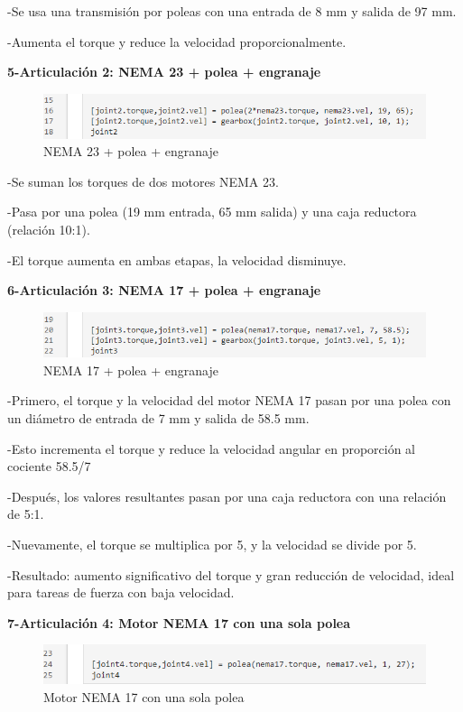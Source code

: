 -Se usa una transmisión por poleas con una entrada de 8 mm y salida de 97 mm.

-Aumenta el torque y reduce la velocidad proporcionalmente.


\textbf{5-Articulación 2: NEMA 23 + polea + engranaje}


\begin{figure} [h]
	\centering
	\includegraphics[width=0.7\linewidth]{img/calculomotores5}
	\caption{NEMA 23 + polea + engranaje}
	\label{fig:calculomotores5}
\end{figure}


-Se suman los torques de dos motores NEMA 23.

-Pasa por una polea (19 mm entrada, 65 mm salida) y una caja reductora (relación 10:1).

-El torque aumenta en ambas etapas, la velocidad disminuye.

\newpage
\textbf{6-Articulación 3: NEMA 17 + polea + engranaje}

\begin{figure} [h]
	\centering
	\includegraphics[width=0.7\linewidth]{img/calculomotores6}
	\caption{NEMA 17 + polea + engranaje}
	\label{fig:calculomotores6}
\end{figure}


-Primero, el torque y la velocidad del motor NEMA 17 pasan por una polea con un diámetro de entrada de 7 mm y salida de 58.5 mm.

-Esto incrementa el torque y reduce la velocidad angular en proporción al cociente 58.5/7

-Después, los valores resultantes pasan por una caja reductora con una relación de 5:1.

-Nuevamente, el torque se multiplica por 5, y la velocidad se divide por 5.

-Resultado: aumento significativo del torque y gran reducción de velocidad, ideal para tareas de fuerza con baja velocidad.


\textbf{7-Articulación 4: Motor NEMA 17 con una sola polea}

\begin{figure} [h]
	\centering
	\includegraphics[width=0.7\linewidth]{img/calculomotores7}
	\caption{Motor NEMA 17 con una sola polea}
	\label{fig:calculomotores7}
\end{figure}


